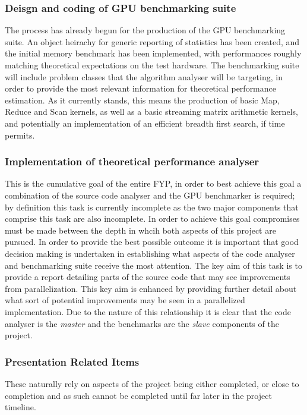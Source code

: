 \subsubsection{Deisgn and coding of GPU benchmarking suite}
The process has already begun for the production of the GPU benchmarking suite. An object heirachy for generic reporting of statistics has been created, and the initial memory benchmark has been implemented, with performances roughly matching theoretical expectations on the test hardware. The benchmarking suite will include problem classes that the algorithm analyser will be targeting, in order to provide the most relevant information for theoretical performance estimation. As it currently stands, this means the production of basic Map, Reduce and Scan kernels, as well as a basic streaming matrix arithmetic kernels, and potentially an implementation of an efficient breadth first search, if time permits.

\subsubsection{Implementation of theoretical performance analyser}
This is the cumulative goal of the entire FYP, in order to best achieve this goal a combination of the source code analyser and the GPU benchmarker is required; by definition this task is currently incomplete as the two major components that comprise this task are also incomplete. In order to achieve this goal compromises must be made between the depth in whcih both aspects of this project are pursued. In order to provide the best possible outcome it is important that good decision making is undertaken in establishing what aspects of the code analyser and benchmarking suite receive the most attention. The key aim of this task is to provide a report detailing parts of the source code that may see improvements from parallelization. This key aim is enhanced by providing further detail about what sort of potential improvements may be seen in a parallelized implementation. Due to the nature of this relationship it is clear that the code analyser is the \textit{master} and the benchmarks are the \textit{slave} components of the project.

\subsubsection{Presentation Related Items}
These naturally rely on aspects of the project being either completed, or close to completion and as such cannot be completed until far later in the project timeline.

